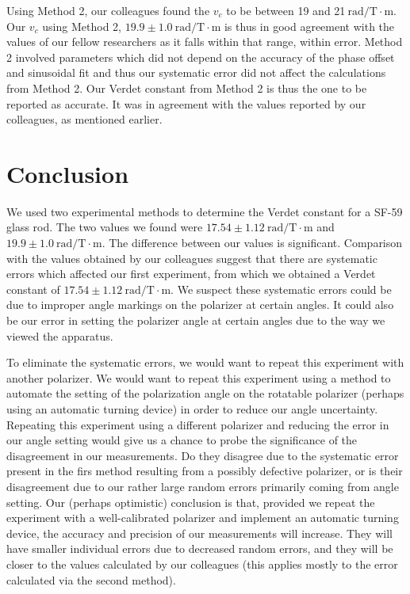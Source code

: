 \documentclass[prb,preprint]{revtex4-1}
\begin{document}
{{Using Method 2, our colleagues found the $v_c$ to be between 19 and 21$\mathrm{~rad/T} \cdot \textrm{m}$.  Our $v_c$ using Method 2, $19.9 \pm 1.0 \mathrm{~rad/T} \cdot \textrm{m}$ is thus in good agreement with the values of our fellow researchers as it falls within that range, within error. 
Method 2 involved parameters which did not depend on the accuracy of the phase offset and sinusoidal fit and thus our systematic error did not affect the calculations from Method 2.  Our Verdet constant from Method 2 is thus the one to be reported as accurate.  
It was in agreement with the values reported by our colleagues, as mentioned earlier.}

\section{Conclusion}
We used two experimental methods to determine the Verdet constant for a SF-59 glass rod. The two values we found were $17.54 \pm 1.12 \mathrm{~rad/T} \cdot \textrm{m}$ and $19.9 \pm 1.0 \mathrm{~rad/T} \cdot \textrm{m}$. The difference between our values is significant. Comparison with the values obtained by our colleagues suggest that there are systematic errors which affected our first experiment, from which we obtained a Verdet constant of $17.54 \pm 1.12 \mathrm{~rad/T} \cdot \textrm{m}$. We suspect these systematic errors could be due to improper angle markings on the polarizer at certain angles. It could also be our error in setting the polarizer angle at certain angles due to the way we viewed the apparatus.

To eliminate the systematic errors, we would want to repeat this experiment with another polarizer. We would want to repeat this experiment using a method to automate the setting of the polarization angle on the rotatable polarizer (perhaps using an automatic turning device) in order to reduce our angle uncertainty. Repeating this experiment using a different polarizer and reducing the error in our angle setting would give us a chance to probe the significance of the disagreement in our measurements.  Do they disagree due to the systematic error present in the firs method resulting from a possibly defective polarizer, or is their disagreement due to our rather large random errors primarily coming from angle setting.    Our (perhaps optimistic) conclusion is that, provided we repeat the experiment with a well-calibrated polarizer and implement an automatic turning device, the accuracy and precision of our measurements will increase.  They will have smaller individual errors due to decreased random errors, and they will be closer to the values calculated by our colleagues (this applies mostly to the error calculated via the second method).

}
\end{document}
